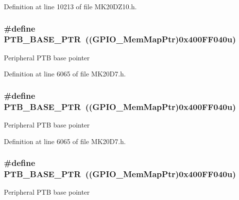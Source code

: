 Definition at line 10213 of file M\+K20\+D\+Z10.\+h.

\subsubsection[{\texorpdfstring{P\+T\+B\+\_\+\+B\+A\+S\+E\+\_\+\+P\+TR}{PTB_BASE_PTR}}]{\setlength{\rightskip}{0pt plus 5cm}\#define P\+T\+B\+\_\+\+B\+A\+S\+E\+\_\+\+P\+TR~(({\bf G\+P\+I\+O\+\_\+\+Mem\+Map\+Ptr})0x400\+F\+F040u)}\hypertarget{group___g_p_i_o___peripheral_ga59ab0f28e891ea28f152505ce2021747}{}\label{group___g_p_i_o___peripheral_ga59ab0f28e891ea28f152505ce2021747}
Peripheral P\+TB base pointer 

Definition at line 6065 of file M\+K20\+D7.\+h.

\subsubsection[{\texorpdfstring{P\+T\+B\+\_\+\+B\+A\+S\+E\+\_\+\+P\+TR}{PTB_BASE_PTR}}]{\setlength{\rightskip}{0pt plus 5cm}\#define P\+T\+B\+\_\+\+B\+A\+S\+E\+\_\+\+P\+TR~(({\bf G\+P\+I\+O\+\_\+\+Mem\+Map\+Ptr})0x400\+F\+F040u)}\hypertarget{group___g_p_i_o___peripheral_ga59ab0f28e891ea28f152505ce2021747}{}\label{group___g_p_i_o___peripheral_ga59ab0f28e891ea28f152505ce2021747}
Peripheral P\+TB base pointer 

Definition at line 6065 of file M\+K20\+D7.\+h.

\subsubsection[{\texorpdfstring{P\+T\+B\+\_\+\+B\+A\+S\+E\+\_\+\+P\+TR}{PTB_BASE_PTR}}]{\setlength{\rightskip}{0pt plus 5cm}\#define P\+T\+B\+\_\+\+B\+A\+S\+E\+\_\+\+P\+TR~(({\bf G\+P\+I\+O\+\_\+\+Mem\+Map\+Ptr})0x400\+F\+F040u)}\hypertarget{group___g_p_i_o___peripheral_ga59ab0f28e891ea28f152505ce2021747}{}\label{group___g_p_i_o___peripheral_ga59ab0f28e891ea28f152505ce2021747}
Peripheral P\+TB base pointer 

